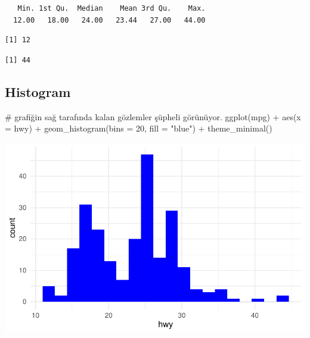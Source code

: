 \documentclass[
  letterpaper,
  DIV=11,
  numbers=noendperiod]{scrreprt}
\newenvironment{Shaded}{\begin{snugshade}}{\end{snugshade}}
\newcommand{\AttributeTok}[1]{\textcolor[rgb]{0.40,0.45,0.13}{#1}}
\newcommand{\CommentTok}[1]{\textcolor[rgb]{0.37,0.37,0.37}{#1}}
\newcommand{\DecValTok}[1]{\textcolor[rgb]{0.68,0.00,0.00}{#1}}
\newcommand{\FunctionTok}[1]{\textcolor[rgb]{0.28,0.35,0.67}{#1}}
\newcommand{\NormalTok}[1]{\textcolor[rgb]{0.00,0.23,0.31}{#1}}
\newcommand{\SpecialCharTok}[1]{\textcolor[rgb]{0.37,0.37,0.37}{#1}}
\newcommand{\StringTok}[1]{\textcolor[rgb]{0.13,0.47,0.30}{#1}}
\begin{document}
\begin{verbatim}
   Min. 1st Qu.  Median    Mean 3rd Qu.    Max. 
  12.00   18.00   24.00   23.44   27.00   44.00 
\end{verbatim}

\begin{Shaded}
\end{Shaded}

\begin{verbatim}
[1] 12
\end{verbatim}

\begin{Shaded}
\end{Shaded}

\begin{verbatim}
[1] 44
\end{verbatim}

\subsection*{Histogram}\label{histogram}

\begin{Shaded}
\begin{Highlighting}[]
\CommentTok{\# grafiğin sağ tarafında kalan gözlemler şüpheli görünüyor.}
\FunctionTok{ggplot}\NormalTok{(mpg) }\SpecialCharTok{+}
  \FunctionTok{aes}\NormalTok{(}\AttributeTok{x =}\NormalTok{ hwy) }\SpecialCharTok{+}
  \FunctionTok{geom\_histogram}\NormalTok{(}\AttributeTok{bins =} \DecValTok{20}\NormalTok{, }\AttributeTok{fill =} \StringTok{"blue"}\NormalTok{) }\SpecialCharTok{+}
  \FunctionTok{theme\_minimal}\NormalTok{()}
\end{Highlighting}
\end{Shaded}

\includegraphics{data_preprocess_files/figure-pdf/unnamed-chunk-12-1.pdf}
\end{document}
